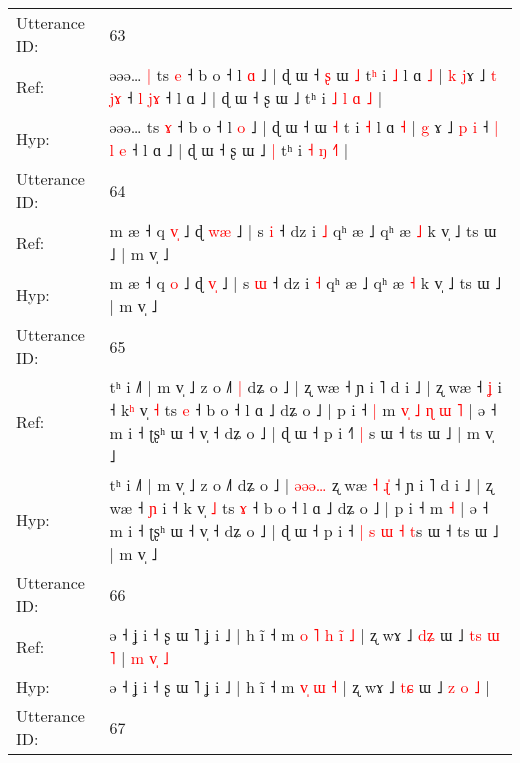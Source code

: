 \documentclass[10pt]{article}
\DeclareRobustCommand{\hl}[1]{{\textcolor{red}{#1}}}
\begin{document}
\begin{longtable}{ll}
 \\
\midrule
Utterance ID: & 63 \\
Ref: & əəə…\hl{ }\hl{|} ts \hl{e} ˧ b o ˧ l \hl{ɑ} ˩ | ɖ ɯ ˧\hl{ }\hl{ʂ} ɯ \hl{˩} t\hl{ʰ} i \hl{˩} l ɑ \hl{˩} | \hl{k} \hl{j}ɤ ˩ \hl{t} \hl{j}\hl{ɤ} ˧ \hl{l} \hl{}\hl{j}\hl{ɤ} ˧ l ɑ ˩ | ɖ ɯ ˧ ʂ ɯ ˩\hl{}\hl{} tʰ i \hl{˩} \hl{l} \hl{ɑ}\hl{ }\hl{˩} |
 \\
Hyp: & əəə…\hl{}\hl{} ts \hl{ɤ} ˧ b o ˧ l \hl{o} ˩ | ɖ ɯ ˧\hl{}\hl{} ɯ \hl{˧} t\hl{} i \hl{˧} l ɑ \hl{˧} | \hl{g} \hl{}ɤ ˩ \hl{p} \hl{}\hl{i} ˧ \hl{|} \hl{l}\hl{ }\hl{e} ˧ l ɑ ˩ | ɖ ɯ ˧ ʂ ɯ ˩\hl{ }\hl{|} tʰ i \hl{˧} \hl{ŋ} \hl{}\hl{˧}\hl{˥} |
 \\
\midrule
Utterance ID: & 64 \\
Ref: & m æ ˧ q \hl{v}\hl{̩} ˩ ɖ \hl{w}\hl{æ} ˩ | s \hl{i} ˧ dz i \hl{˩} qʰ æ ˩ qʰ æ \hl{˩} k v̩ ˩ ts ɯ ˩ | m v̩ ˩
 \\
Hyp: & m æ ˧ q \hl{}\hl{o} ˩ ɖ \hl{v}\hl{̩} ˩ | s \hl{ɯ} ˧ dz i \hl{˧} qʰ æ ˩ qʰ æ \hl{˧} k v̩ ˩ ts ɯ ˩ | m v̩ ˩
 \\
\midrule
Utterance ID: & 65 \\
Ref: & tʰ i ˩˥ | m v̩ ˩ z o ˩˥\hl{ }\hl{|} dʑ o ˩ |\hl{}\hl{}\hl{}\hl{}\hl{} ʐ wæ\hl{}\hl{}\hl{}\hl{}\hl{} ˧ ɲ i ˥ d i ˩ | ʐ wæ ˧ \hl{ʝ} i ˧ k\hl{ʰ} v̩ \hl{˧} ts \hl{e} ˧ b o ˧ l ɑ ˩ dʑ o ˩ | p i ˧\hl{ }\hl{|} m\hl{ }\hl{v}\hl{̩}\hl{ }\hl{˩}\hl{ }\hl{ɳ}\hl{ }\hl{ɯ} \hl{˥} | ə ˧ m i ˧ ʈʂʰ ɯ ˧ v̩ ˧ dʑ o ˩ | ɖ ɯ ˧ p i ˧\hl{}\hl{}\hl{}\hl{}\hl{}\hl{˥} \hl{|} \hl{}s ɯ ˧ ts ɯ ˩ | m v̩ ˩
 \\
Hyp: & tʰ i ˩˥ | m v̩ ˩ z o ˩˥\hl{}\hl{} dʑ o ˩ |\hl{ }\hl{ə}\hl{ə}\hl{ə}\hl{…} ʐ wæ\hl{ }\hl{˧}\hl{ }\hl{ɻ}\hl{̍} ˧ ɲ i ˥ d i ˩ | ʐ wæ ˧ \hl{ɲ} i ˧ k\hl{} v̩ \hl{˩} ts \hl{ɤ} ˧ b o ˧ l ɑ ˩ dʑ o ˩ | p i ˧\hl{}\hl{} m\hl{}\hl{}\hl{}\hl{}\hl{}\hl{}\hl{}\hl{}\hl{} \hl{˧} | ə ˧ m i ˧ ʈʂʰ ɯ ˧ v̩ ˧ dʑ o ˩ | ɖ ɯ ˧ p i ˧\hl{ }\hl{|}\hl{ }\hl{s}\hl{ }\hl{ɯ} \hl{˧} \hl{t}s ɯ ˧ ts ɯ ˩ | m v̩ ˩
 \\
\midrule
Utterance ID: & 66 \\
Ref: & ə ˧ ʝ i ˧ ʂ ɯ ˥ ʝ i ˩ | h ĩ ˧ m\hl{ }\hl{o} \hl{˥}\hl{ }\hl{h} \hl{i}\hl{̃} \hl{˩} | ʐ wɤ ˩ \hl{d}\hl{ʑ} ɯ ˩ \hl{t}\hl{s} \hl{ɯ} \hl{˥} |\hl{ }\hl{m}\hl{ }\hl{v}\hl{̩}\hl{ }\hl{˩}
 \\
Hyp: & ə ˧ ʝ i ˧ ʂ ɯ ˥ ʝ i ˩ | h ĩ ˧ m\hl{}\hl{} \hl{}\hl{v}\hl{̩} \hl{}\hl{ɯ} \hl{˧} | ʐ wɤ ˩ \hl{t}\hl{ɕ} ɯ ˩ \hl{}\hl{z} \hl{o} \hl{˩} |\hl{}\hl{}\hl{}\hl{}\hl{}\hl{}\hl{}
 \\
\midrule
Utterance ID: & 67 \\

\end{longtable}
\end{document}
